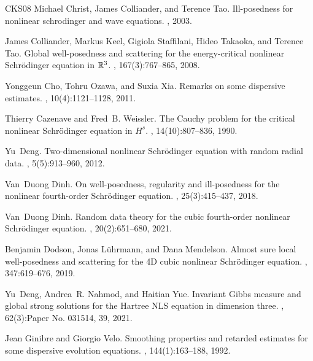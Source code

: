\documentclass[10pt,leqno]{amsart}
\numberwithin{equation}{section}
\begin{document}
\begin{thebibliography}{CKS{\etalchar{+}}08}
Michael Christ, James Colliander, and Terence Tao.
\newblock Ill-posedness for nonlinear schrodinger and wave equations.
, 2003.

James Colliander, Markus Keel, Gigiola Staffilani, Hideo Takaoka, and Terence
  Tao.
\newblock Global well-posedness and scattering for the energy-critical
  nonlinear {S}chr\"{o}dinger equation in {$\Bbb R^3$}.
, 167(3):767--865, 2008.

Yonggeun Cho, Tohru Ozawa, and Suxia Xia.
\newblock Remarks on some dispersive estimates.
, 10(4):1121--1128, 2011.

Thierry Cazenave and Fred~B. Weissler.
\newblock The {C}auchy problem for the critical nonlinear {S}chr\"{o}dinger
  equation in {$H^s$}.
, 14(10):807--836, 1990.

Yu~Deng.
\newblock Two-dimensional nonlinear {S}chr\"{o}dinger equation with random
  radial data.
, 5(5):913--960, 2012.

Van~Duong Dinh.
\newblock On well-posedness, regularity and ill-posedness for the nonlinear
  fourth-order {S}chr\"{o}dinger equation.
, 25(3):415--437, 2018.

Van~Duong Dinh.
\newblock Random data theory for the cubic fourth-order nonlinear
  {S}chr\"{o}dinger equation.
, 20(2):651--680, 2021.

Benjamin Dodson, Jonas L\"{u}hrmann, and Dana Mendelson.
\newblock Almost sure local well-posedness and scattering for the 4{D} cubic
  nonlinear {S}chr\"{o}dinger equation.
, 347:619--676, 2019.

Yu~Deng, Andrea~R. Nahmod, and Haitian Yue.
\newblock Invariant {G}ibbs measure and global strong solutions for the
  {H}artree {NLS} equation in dimension three.
, 62(3):Paper No. 031514, 39, 2021.

Jean Ginibre and Giorgio Velo.
\newblock Smoothing properties and retarded estimates for some dispersive
  evolution equations.
, 144(1):163--188, 1992.


\end{thebibliography}
\end{document}
